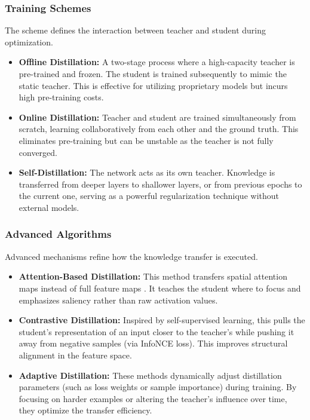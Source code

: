 \subsubsection{Training Schemes}
The scheme defines the interaction between teacher and student during optimization.
\begin{itemize}
    \item \textbf{Offline Distillation:} A two-stage process where a high-capacity teacher is pre-trained and frozen. The student is trained subsequently to mimic the static teacher. This is effective for utilizing proprietary models but incurs high pre-training costs.
    \item \textbf{Online Distillation:} Teacher and student are trained simultaneously from scratch, learning collaboratively from each other and the ground truth. This eliminates pre-training but can be unstable as the teacher is not fully converged.
    \item \textbf{Self-Distillation:} The network acts as its own teacher. Knowledge is transferred from deeper layers to shallower layers, or from previous epochs to the current one, serving as a powerful regularization technique without external models.
\end{itemize}

\subsubsection{Advanced Algorithms}
Advanced mechanisms refine how the knowledge transfer is executed.
\begin{itemize}
    \item \textbf{Attention-Based Distillation:} This method transfers spatial attention maps instead of full feature maps \cite{Zagoruyko2016}. It teaches the student where to focus and emphasizes saliency rather than raw activation values.
    \item \textbf{Contrastive Distillation:} Inspired by self-supervised learning, this pulls the student's representation of an input closer to the teacher's while pushing it away from negative samples (via InfoNCE loss). This improves structural alignment in the feature space.
    \item \textbf{Adaptive Distillation:} These methods dynamically adjust distillation parameters (such as loss weights or sample importance) during training. By focusing on harder examples or altering the teacher's influence over time, they optimize the transfer efficiency.
\end{itemize}

